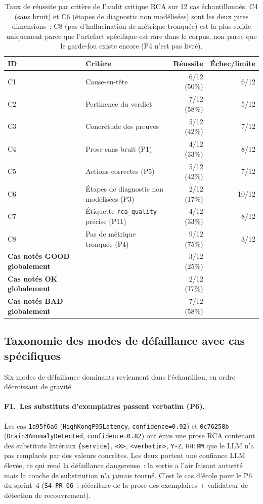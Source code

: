 \documentclass[11pt,a4paper,oneside]{report}
\begin{document}
\begin{table}[h]
\centering
\small
\begin{tabular}{llrr}
\toprule
\textbf{ID} & \textbf{Critère} & \textbf{Réussite} & \textbf{Échec/limite} \\
\midrule
C1 & Cause-en-tête           &  6/12 (50\%) & 6/12 \\
C2 & Pertinence du verdict   &  7/12 (58\%) & 5/12 \\
C3 & Concrétude des preuves  &  5/12 (42\%) & 7/12 \\
C4 & Prose sans bruit (P1)   &  4/12 (33\%) & 8/12 \\
C5 & Actions correctes (P5)  &  5/12 (42\%) & 7/12 \\
C6 & Étapes de diagnostic non modélisées (P3) & 2/12 (17\%) & 10/12 \\
C7 & Étiquette \texttt{rca\_quality} précise (P11) & 4/12 (33\%) & 8/12 \\
C8 & Pas de métrique tronquée (P4) &  9/12 (75\%) & 3/12 \\
\midrule
\textbf{Cas notés GOOD globalement}     & & 3/12 (25\%) & \\
\textbf{Cas notés OK globalement}       & & 2/12 (17\%) & \\
\textbf{Cas notés BAD globalement}      & & 7/12 (58\%) & \\
\bottomrule
\end{tabular}
\caption{Taux de réussite par critère de l'audit critique RCA sur
12 cas échantillonnés. C4 (sans bruit) et C6 (étapes de diagnostic
non modélisées) sont les deux pires dimensions~; C8 (pas
d'hallucination de métrique tronquée) est la plus solide uniquement
parce que l'artefact spécifique est rare dans le corpus, non parce
que le garde-fou existe encore (P4 n'est pas livré).}
\label{tab:critical-rca}
\end{table}

\subsection{Taxonomie des modes de défaillance avec cas spécifiques}

Six modes de défaillance dominants reviennent dans l'échantillon,
en ordre décroissant de gravité.

\paragraph{F1.~Les substituts d'exemplaires passent verbatim (P6).}
Les cas \texttt{1a95f6a6} (\texttt{HighKongP95Latency},
\texttt{confidence=0.92}) et \texttt{0c76258b}
(\texttt{Drain3AnomalyDetected}, \texttt{confidence=0.82}) ont émis
une prose RCA contenant des substituts littéraux
\texttt{\{service\}}, \texttt{<X>}, \texttt{<verbatim>},
\texttt{Y-Z}, \texttt{HH:MM} que le LLM n'a pas remplacés par des
valeurs concrètes. Les deux portent une confiance LLM élevée, ce
qui rend la défaillance dangereuse~: la sortie a l'air faisant
autorité mais la couche de substitution n'a jamais tourné. C'est le
cas d'école pour le P6 du sprint~4
(\texttt{S4-PR-06}~: réécriture de la prose des exemplaires +
validateur de détection de recouvrement).
\end{document}

